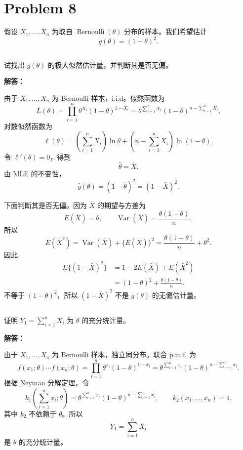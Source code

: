 \documentclass[12pt,a4paper]{article}
\begin{document}
\section{Problem 8}

假设 $X_1,\ldots,X_n$ 为取自 $\operatorname{Bernoulli}(\theta)$ 分布的样本。我们希望估计
\[
g(\theta)=(1-\theta)^2.
\]

\subsection{}

试找出 $g(\theta)$ 的极大似然估计量，并判断其是否无偏。

\begin{answerbox}
\textbf{解答：}

由于 $X_1,\ldots,X_n$ 为 Bernoulli 样本，i.i.d。似然函数为
\[
L(\theta)=\prod_{i=1}^n\theta^{X_i}(1-\theta)^{1-X_i}
=\theta^{\sum_{i=1}^nX_i}(1-\theta)^{n-\sum_{i=1}^nX_i}.
\]
对数似然函数为
\[
\ell(\theta)=\left(\sum_{i=1}^nX_i\right)\ln\theta+
\left(n-\sum_{i=1}^nX_i\right)\ln(1-\theta).
\]
令 $\ell'(\theta)=0$，得到
\[
\hat\theta=\bar X.
\]
由 MLE 的不变性，
\[
\hat{g}(\theta)=(1-\hat\theta)^2=(1-\bar X)^2.
\]

下面判断其是否无偏。因为 $\bar X$ 的期望与方差为
\[
E(\bar X)=\theta,
\qquad
\operatorname{Var}(\bar X)=\frac{\theta(1-\theta)}{n},
\]
所以
\[
E(\bar X^2)=\operatorname{Var}(\bar X)+\{E(\bar X)\}^2
=\frac{\theta(1-\theta)}{n}+\theta^2.
\]
因此
\[
\begin{aligned}
E\{(1-\bar X)^2\}
&=1-2E(\bar X)+E(\bar X^2)\\
&=(1-\theta)^2+\frac{\theta(1-\theta)}{n}.
\end{aligned}
\]
不等于 $(1-\theta)^2$，所以 $(1-\bar X)^2$ 不是 $g(\theta)$ 的无偏估计量。
\end{answerbox}

\subsection{}

 证明 $Y_1=\sum_{i=1}^{n}X_i$ 为 $\theta$ 的充分统计量。

\begin{answerbox}
\textbf{解答：}

由于 $X_1,\ldots,X_n$ 为 Bernoulli 样本，独立同分布。联合 p.m.f. 为
\[
f(x_1;\theta)\cdots f(x_n;\theta)
=\prod_{i=1}^n\theta^{x_i}(1-\theta)^{1-x_i}
=\theta^{\sum_{i=1}^nx_i}(1-\theta)^{n-\sum_{i=1}^nx_i}.
\]
根据 Neyman 分解定理，令
\[
k_1\left(\sum_{i=1}^nx_i;\theta\right)
=\theta^{\sum_{i=1}^nx_i}(1-\theta)^{n-\sum_{i=1}^nx_i},
\qquad
k_2(x_1,\ldots,x_n)=1.
\]
其中 $k_2$ 不依赖于 $\theta$。所以
\[
Y_1=\sum_{i=1}^nX_i
\]
是 $\theta$ 的充分统计量。
\end{answerbox}
\end{document}
